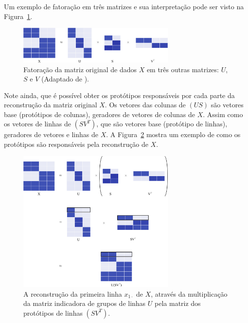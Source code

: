\documentclass[
    12pt,                %
    oneside,            %
    a4paper,            %
    english,            %
    brazil                %
    ]{abntex2ppgsi}
\begin{document}
Um exemplo de fatoração em três matrizes e sua interpretação pode ser visto na Figura~\ref{fig:bvd}.

\begin{figure}[H]
\centering
    \includegraphics[width=0.7\textwidth]{img/factorizationXUSV.png}
    \caption{
        Fatoração da matriz original de dados $X$ em três outras matrizes: $U$, $S$ e $V$ (Adaptado de ).
    }
    \label{fig:bvd}
\end{figure}

Note ainda, que é possível obter os protótipos responsáveis por cada parte da reconstrução da matriz original $X$.
Os vetores das colunas de $(US)$ são vetores base (protótipos de colunas), geradores de vetores de colunas de $X$.
Assim como os vetores de linhas de $(SV^T)$, que são vetores base (protótipo de linhas), geradores de vetores e linhas de $X$.
A Figura~\ref{fig:bvd:reconstruction} mostra um exemplo de como os protótipos são responsáveis pela reconstrução de $X$.

\begin{figure}[H]
\centering
    \includegraphics[width=0.7\textwidth]{img/reconstruction.png}
    \caption{
        A reconstrução da primeira linha $x_{1 \cdot}$ de $X$, através da multiplicação da matriz indicadora de grupos de linhas $U$ pela matriz dos protótipos de linhas $(S V^T)$. %
    }
    \label{fig:bvd:reconstruction}
\end{figure}
\end{document}
